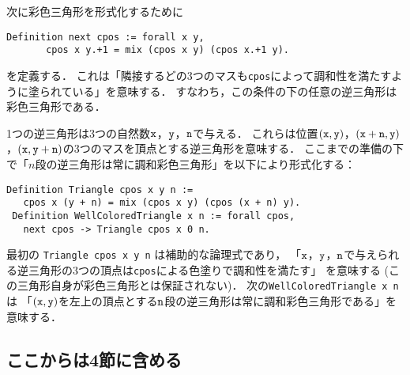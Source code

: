次に彩色三角形を形式化するために
\begin{lstlisting}[language=Coq]
 Definition next cpos := forall x y,
       cpos x y.+1 = mix (cpos x y) (cpos x.+1 y).
\end{lstlisting}
を定義する．
これは「隣接するどの3つのマスも{\tt cpos}によって調和性を満たすように塗られている」を意味する．
すなわち，この条件の下の任意の逆三角形は彩色三角形である．

1つの逆三角形は3つの自然数${\tt x}$，${\tt y}$，${\tt n}$で与える．
これらは位置$({\tt x},{\tt y})$，$({\tt x}+{\tt n},{\tt y})$，$({\tt x},{\tt y}+{\tt n})$の3つのマスを頂点とする逆三角形を意味する．
ここまでの準備の下で「$n$段の逆三角形は常に調和彩色三角形」を以下により形式化する：
\begin{lstlisting}[language=Coq]
 Definition Triangle cpos x y n :=
   cpos x (y + n) = mix (cpos x y) (cpos (x + n) y).
 Definition WellColoredTriangle x n := forall cpos,
   next cpos -> Triangle cpos x 0 n.
\end{lstlisting}
最初の {\tt Triangle cpos x y n} は補助的な論理式であり，
「${\tt x}$，${\tt y}$，${\tt n}$で与えられる逆三角形の3つの頂点は{\tt cpos}による色塗りで調和性を満たす」
を意味する (この三角形自身が彩色三角形とは保証されない)．
次の{\tt WellColoredTriangle x n} は
「$({\tt x},{\tt y})$を左上の頂点とする${\tt n}$段の逆三角形は常に調和彩色三角形である」を意味する．








\subsection{ここからは4節に含める}





